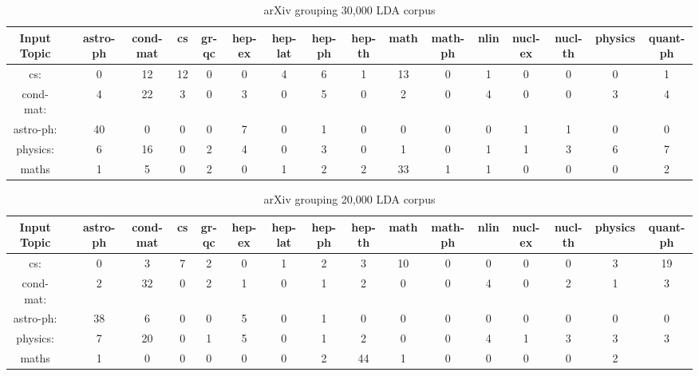 \begin{sidewaystable}[h]
    \begin{tabular}{|c c c c c c c c c c c c c c c c c|}
         \hline
         Input Topic & & astro-ph & cond-mat & cs & gr-qc & hep-ex &hep-lat & hep-ph & hep-th & math & math-ph & nlin & nucl-ex & nucl-th & physics & quant-ph \\ [0.5ex]
         \hline\hline
         cs: & & 0 & 12 & 12 & 0 & 0 & 4 & 6 & 1 & 13 & 0 & 1 & 0 & 0 & 0 & 1\\
         cond-mat: & & 4 & 22 & 3 & 0 & 3 & 0 & 5 & 0 & 2 & 0 & 4 & 0 & 0 & 3 & 4\\
         astro-ph: & & 40 & 0 & 0 & 0 & 7 & 0 & 1 & 0 & 0 & 0 & 0 & 1 & 1 & 0 & 0\\
         physics: & & 6 & 16 & 0 & 2 & 4 & 0 & 3 & 0 & 1 & 0 & 1 & 1 & 3 & 6 & 7 \\
         maths & & 1 & 5 & 0 & 2 & 0 & 1 & 2 & 2 & 33 & 1 & 1 & 0 & 0 & 0 & 2 \\ [1ex]
         \hline
    \end{tabular}
    \caption{arXiv grouping 30,000 LDA corpus}
    \label{table:arxiv30000lda}
\end{sidewaystable}

\begin{sidewaystable}[h]
    \begin{tabular}{|c c c c c c c c c c c c c c c c c|}
         \hline
         Input Topic & & astro-ph & cond-mat & cs & gr-qc & hep-ex &hep-lat & hep-ph & hep-th & math & math-ph & nlin & nucl-ex & nucl-th & physics & quant-ph \\ [0.5ex]
         \hline\hline
         cs: & & 0 & 3 & 7 & 2 & 0 & 1 & 2 & 3 & 10 & 0 & 0 & 0 & 0 & 3 & 19 \\
         cond-mat: & & 2 & 32 & 0 & 2 & 1 & 0 & 1 & 2 & 0 & 0 & 4 & 0 & 2 & 1 & 3 \\
         astro-ph: & & 38 & 6 & 0 & 0 & 5 & 0 & 1 & 0 & 0 & 0 & 0 & 0 & 0 & 0 & 0 \\
         physics: & & 7 & 20 & 0 & 1 & 5 & 0 & 1 & 2 & 0 & 0 & 4 & 1 & 3 & 3 & 3 \\
         maths & & 1 & 0 & 0 & 0 & 0 & 0 & 2 & 44 & 1 & 0 & 0 & 0 & 0 & 2 \\ [1ex]
         \hline
    \end{tabular}
    \caption{arXiv grouping 20,000 LDA corpus}
    \label{table:arxiv20000lda}
\end{sidewaystable}

